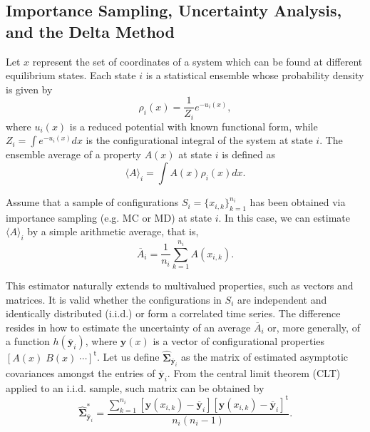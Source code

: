 \documentclass[journal=jctcce,manuscript=article,layout=twocolumn]{achemso}
\newcommand{\mt}[1]{\boldsymbol{\mathbf{#1}}}   %
\newcommand{\vt}[1]{\boldsymbol{\mathbf{#1}}}   %
\newcommand{\tr}[1]{#1^\text{t}}                %
\newcommand{\avg}[1]{\overline{#1}}             %
\begin{document}
\subsection{Importance Sampling, Uncertainty Analysis, and the Delta Method}
\label{sec:definitions}

Let $x$ represent the set of coordinates of a system which can be found at different equilibrium states. Each state $i$ is a statistical ensemble whose probability density is given by
\begin{equation}
\label{eq:state_prob_density}
\rho_i(x) = \frac{1}{Z_i} e^{-u_i(x)},
\end{equation}
where $u_i(x)$ is a reduced potential \cite{Shirts_2008, Chodera_2011_2} with known functional form, while $Z_i = \int e^{-u_i(x)}dx$ is the configurational integral of the system at state $i$. The ensemble average of a property $A(x)$ at state $i$ is defined as
\begin{equation}
\label{eq:ensemble average}
\langle A \rangle_i = \int A(x)\rho_i(x)dx.
\end{equation}

Assume that a sample of configurations $S_i = \{x_{i,k}\}_{k=1}^{n_i}$ has been obtained via importance sampling \cite{Allen_1987} (e.g. MC or MD) at state $i$. In this case, we can estimate $\langle A \rangle_i$ by a simple arithmetic average, that is,
\begin{equation}
\label{eq:average estimator}
\avg A_i = \frac{1}{n_i} \sum_{k=1}^{n_i} A(x_{i,k}).
\end{equation}

This estimator naturally extends to multivalued properties, such as vectors and matrices. It is valid whether the configurations in $S_i$ are independent and identically distributed (i.i.d.) or form a correlated time series. The difference resides in how to estimate the uncertainty of an average $\avg A_i$ or, more generally, of a function $h(\avg {\vt y}_i)$, where $\vt y(x)$ is a vector of configurational properties $\tr{[A(x) \; B(x) \; \cdots]}$. Let us define $\hat{\mt \Sigma}_{\avg{\vt y}_i}$ as the matrix of estimated asymptotic covariances amongst the entries of $\avg{\vt y}_i$. From the central limit theorem (CLT) applied to an i.i.d. sample, such matrix can be obtained by
\begin{equation}
\label{eq:asymptotic covariance IID}
\hat{\mt \Sigma}^\ast_{\avg{\vt y}_i} = \frac{\sum\limits_{k=1}^{n_i} \left[\vt y(x_{i,k}) - \avg{\vt y}_i\right] \tr{\left[\vt y(x_{i,k}) - \avg{\vt y}_i\right]}}{n_i(n_i - 1)}.
\end{equation}
\end{document}
